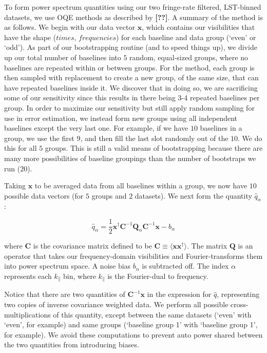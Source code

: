 \documentclass[preprint2,numberedappendix,tighten,twocolappendix]{aastex6}  %
\newcommand{\cc}[1]{{\color{purple} \textbf{[#1]}}}
\begin{document}
To form power spectrum quantities using our two fringe-rate filtered, LST-binned datasets, we use OQE methods as described by \cc{??}. A summary of the method is as follows. We begin with our data vector $\textbf{x}$, which contains our visibilities that have the shape ($times$, $frequencies$) for each baseline and data group (`even' or `odd'). As part of our bootstrapping routine (and to speed things up), we divide up our total number of baselines into $5$ random, equal-sized groups, where no baselines are repeated within or between groups. For the \citet{ali_et_al2015} method, each group is then sampled with replacement to create a new group, of the same size, that can have repeated baselines inside it. We discover that in doing so, we are sacrificing some of our sensitivity since this results in there being 3-4 repeated baselines per group. In order to maximize our sensitivity but still apply random sampling for use in error estimation, we instead form new groups using all independent baselines except the very last one. For example, if we have $10$ baselines in a group, we use the first $9$, and then fill the last slot randomly out of the $10$. We do this for all $5$ groups. This is still a valid means of bootstrapping because there are many more possibilities of baseline groupings than the number of bootstraps we run ($20$).

Taking $\textbf{x}$ to be averaged data from all baselines within a group, we now have $10$ possible data vectors (for $5$ groups and $2$ datasets). We next form the quantity $\hat{q}_{\alpha}$:

\begin{equation}
\hat{q}_{\alpha} = \frac{1}{2}\textbf{x}^{\dagger}\textbf{C}^{-1}\textbf{Q}_{\alpha}\textbf{C}^{-1}\textbf{x}-b_{\alpha}
\end{equation}

where $\textbf{C}$ is the covariance matrix defined to be $\textbf{C} \equiv \langle\textbf{x}\textbf{x}^{\dagger}\rangle$. The matrix $\textbf{Q}$ is an operator that takes our frequency-domain visibilities and Fourier-transforms them into power spectrum space. A noise bias $b_{\alpha}$ is subtracted off. The index $\alpha$ represents each $k_{\parallel}$ bin, where $k_{\parallel}$ is the Fourier-dual to frequency.

Notice that there are two quantities of $\textbf{C}^{-1}\textbf{x}$ in the expression for $\hat{q}$, representing two copies of inverse covariance weighted data. We perform all possible cross-multiplications of this quantity, except between the same datasets (`even' with `even', for example) and same groups (`baseline group 1' with `baseline group 1', for example). We avoid these computations to prevent auto power shared between the two quantities from introducing biases. 
\end{document}

